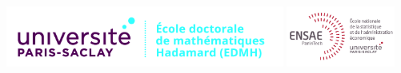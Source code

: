 \documentclass[a4paper,12pt]{book}
\begin{document}
{\setlength{\baselineskip}{0.8\baselineskip}
\vglue-2cm
\topmargin=-5mm
\textwidth=150mm
\oddsidemargin=0mm
\textheight=250mm

\voffset-10pt
\noindent
\hspace*{-1cm}\hbox{\includegraphics[height=2cm]{ed_edmh-h.jpg}} 
\hfill
\hbox{\includegraphics[height=2cm]{logoensae-psay.jpg}}
\vspace{7mm}

}
\end{document}
